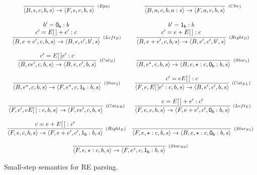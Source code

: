 \documentclass[oneside,12pt]{scrbook}
\theoremstyle{definition}
\newcommand{\C}[1]{\red{\mathsf{#1}}}
\newcommand{\conf}[1]{\ensuremath{\langle #1 \rangle}}
\theoremstyle{plain}
\theoremstyle{definition}
\begin{document}
\begin{figure}[h]
	\[
	\begin{array}{cc}
	\infer[_{(Eps)}]{\conf{B,\epsilon,c,b,s} \to \conf{F,\epsilon,c,b,s}}{}
	&
	\infer[_{(Chr)}]{\conf{B,a,c,b,a:s} \to \conf{F,a,c,b,s}}{}
	
	\\ \\
	\infer[_{(Left_B)}]{\conf{B,e+e',c,b,s}\to\conf{B,e,c',b',s}}
	{\begin{array}{c}
		b' = \ensuremath{\C{0_b}} : b\\
		c' = E[\,]+e' : c \\
		\end{array}}
	&
	\infer[_{(Right_B)}]{\conf{B,e+e',c,b,s}\to\conf{B,e',c',b',s}}
	{\begin{array}{c}
		b' = \ensuremath{\C{1_b}} : b\\
		c' = e + E[\,] : c \\
		\end{array}}
	
	\\ \\
	\infer[_{(Cat_B)}]{\conf{B,ee',c,b,s}\to\conf{B,e,c',b,s}}
	{c' = E[\,]e' : c}
	&
	\infer[_{(Star_1)}]{\conf{B,e^\star,c,b,s}\to\conf{B,e,\star : c, \ensuremath{\C{0_b}} : b, s}}{}
	
	\\ \\
	\infer[_{(Star_2)}]{\conf{B,e^\star,c,b,s}\to\conf{F,e^\star, c, \ensuremath{\C{1_b}} : b, s}}{}
	&
	\infer[_{(Cat_{EL})}]{\conf{F,e,E[\,]e':c,b,s}\to\conf{B,e',c',b,s}}{c'=eE[\,]:c}
	
	\\ \\
	\infer[_{(Cat_{ER})}]{\conf{F,e',eE[\,]:c,b,s}\to\conf{F,ee',c,b,s}}{}
	&
	\infer[_{(Left_E)}]{\conf{F,e,c,b,s}\to\conf{F,e+e',c',\ensuremath{\C{0_b}}:b,s}}{c = E[\,]+e' : c'}
	
	\\ \\
	
	\infer[_{(Right_E)}]{\conf{F,e,c,b,s}\to\conf{F,e+e',c',\ensuremath{\C{1_b}}:b,s}}{c = e + E[\,] : c'}
	&
	\infer[_{(Star_{E1})}]{\conf{F,e,\star:c,b,s}\to\conf{B,e,\star:c,\ensuremath{\C{0_b}}:b,s}}{}
	
	\\ \\
	
	\multicolumn{2}{c}{
		
		\begin{array}{c}
			\infer[_{(Star_{E2})}]{\conf{F,e,\star:c,b,s}\to\conf{F,e^\star,c,\ensuremath{\C{1_b}}:b,s}}{}
		\end{array}
		
	}
	\end{array}
	\]
	\centering
	\caption{Small-step semantics for RE parsing.}
	\label{figure:smallstep}
\end{figure}
\end{document}
